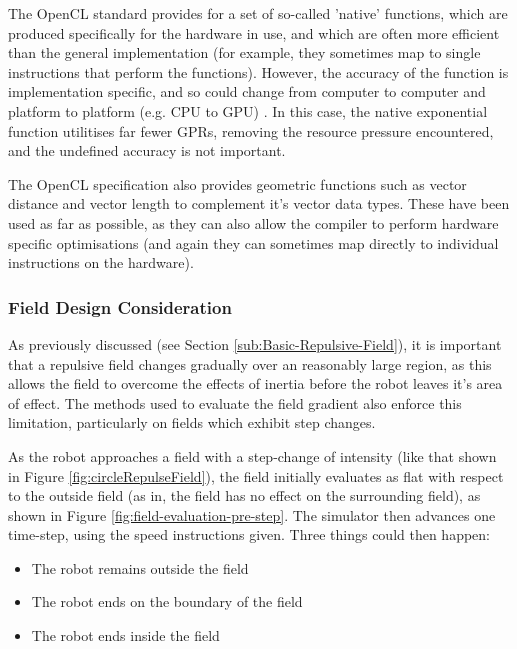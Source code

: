 \documentclass[10pt]{article}
\begin{document}
The OpenCL standard provides for a set of so-called 'native' functions, which
are produced specifically for the hardware in use, and which are often more
efficient than the general implementation (for example, they sometimes map to
single instructions that perform the functions). However, the accuracy of the
function is implementation specific, and so could change from computer to
computer and platform to platform (e.g. CPU to GPU)
\cite{openCl11Spec}. In this case, the native exponential function utilitises
far fewer GPRs, removing the resource pressure encountered, and the
undefined accuracy is not important.

The OpenCL specification also provides geometric functions such as vector
distance and vector length to complement it's vector data types. These have been
used as far as possible, as they can also allow the compiler to perform hardware
specific optimisations (and again they can sometimes map directly to individual
instructions on the hardware).\cite{openCl11Spec}

\subsubsection{Field Design Consideration\label{sub:fieldDesignConsiderations}}

As previously discussed (see Section \ref{sub:Basic-Repulsive-Field}), it is
important that a repulsive field changes gradually over an reasonably large
region, as this allows the field to overcome the effects of inertia before the
robot leaves it's area of effect.  The methods used to evaluate the field
gradient also enforce this limitation, particularly on fields which exhibit step
changes.

As the robot approaches a field with a step-change of intensity (like that shown
in Figure \ref{fig:circleRepulseField}), the field initially evaluates as flat
with respect to the outside field (as in, the field has no effect on the surrounding
field), as shown in Figure \ref{fig:field-evaluation-pre-step}.  The simulator
then advances one time-step, using the speed instructions given.  Three things
could then happen:

\begin{itemize}
  \item The robot remains outside the field
  \item The robot ends on the boundary of the field
  \item The robot ends inside the field
\end{itemize}
\end{document}
